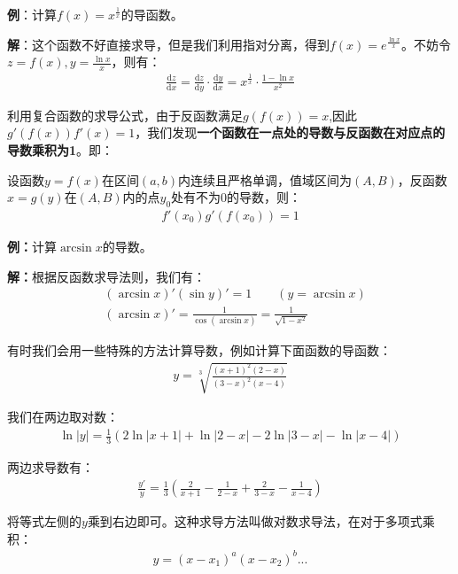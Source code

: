 \documentclass{ctexart}
\let\oldtextbf\textbf %
\renewcommand{\textbf}[1]{\textcolor{btex}{\oldtextbf{#1}}} %
\begin{document}
\textbf{例}：计算$f(x)=x^{\frac{1}{x}}$的导函数。

\textbf{解}：这个函数不好直接求导，但是我们利用指对分离，得到$f(x)=e^{\frac{\ln x}{x}}$。不妨令$z=f(x),y=\frac{\ln x}{x}$，则有：
\begin{align*}
    \frac{\mathrm{d}z}{\mathrm{d}x}=\frac{\mathrm{d}z}{\mathrm{d}y}\cdot\frac{\mathrm{d}y}{\mathrm{d}x}=x^{\frac{1}{x}}\cdot\frac{1-\ln x}{x^2}
\end{align*}

利用复合函数的求导公式，由于反函数满足$g(f(x))=x$,因此$g'(f(x))f'(x)=1$，我们发现\textbf{一个函数在一点处的导数与反函数在对应点的导数乘积为1}。即：
\begin{tcolorbox}[
    colback=bac1,     %
    colframe=fra1,   %
    coltitle=white,             %
    coltext=tex1,
    title=反函数求导法则,
    fonttitle=\bfseries,        %
arc=3mm,                     %
breakable
]
设函数$y=f(x)$在区间$(a,b)$内连续且严格单调，值域区间为$(A,B)$，反函数$x=g(y)$在$(A,B)$内的点$y_0$处有不为0的导数，则：
\begin{align*}
    f'(x_0)g'(f(x_0))=1\tag{2-7}
\end{align*}
\end{tcolorbox}

\textbf{例：}计算$\arcsin x$的导数。

\textbf{解：}根据反函数求导法则，我们有：
\begin{align*}
    &(\arcsin x)'(\sin y)'=1\qquad (y=\arcsin x)\\
    &(\arcsin x)'=\frac{1}{\cos(\arcsin x)}=\frac{1}{\sqrt{1-x^2}}
\end{align*}

有时我们会用一些特殊的方法计算导数，例如计算下面函数的导函数：
\begin{align*}
    y=\sqrt[3]{\frac{(x+1)^2(2-x)}{(3-x)^2(x-4)}}
\end{align*}

我们在两边取对数：
\begin{align*}
    \ln|y|=\frac{1}{3}(2\ln|x+1|+\ln|2-x|-2\ln|3-x|-\ln|x-4|)
\end{align*}

两边求导数有：
\begin{align*}
    \frac{y'}{y}=\frac{1}{3}(\frac{2}{x+1}-\frac{1}{2-x}+\frac{2}{3-x}-\frac{1}{x-4})
\end{align*}

将等式左侧的$y$乘到右边即可。这种求导方法叫做对数求导法，在对于多项式乘积：
\begin{align*}
    y=(x-x_1)^a(x-x_2)^b...
\end{align*}
\end{document}
